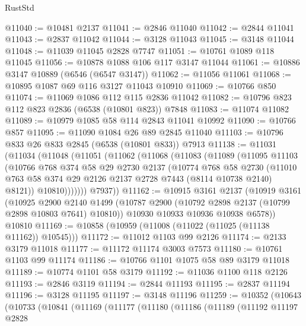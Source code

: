 \begin{lexlean}{RustStd}
\begin{coremodule}
@11040 := @10481 @2137
@11041 := @2846 @11040
@11042 := @2844 @11041
@11043 := @2837 @11042
@11044 := @3128 @11043
@11045 := @3148 @11044
@11048 := @11039 @11045 @2828 @7747
@11051 := @10761 @1089 @118 @11045
@11056 := @10878 @1088 @106 @117 @3147 @11044
@11061 := @10886 @3147 @10889 (@6546 (@6547 @3147))
@11062 := @11056 @11061
@11068 := @10895 @1087 @69 @116 @3127 @11043 @10910
@11069 := @10766 @850
@11074 := @11069 @1086 @112 @115 @2836 @11042
@11082 := @10796 @823 @112 @823 @2836 (@6538 (@10801 @823)) @7848
@11083 := @11074 @11082
@11089 := @10979 @1085 @58 @114 @2843 @11041 @10992
@11090 := @10766 @857
@11095 := @11090 @1084 @26 @89 @2845 @11040
@11103 := @10796 @833 @26 @833 @2845 (@6538 (@10801 @833)) @7913
@11138 := @11031
    (@11034
      (@11048
        (@11051
          (@11062
            (@11068
              (@11083
                (@11089
                  (@11095
                    @11103
                    (@10766
                      @768
                      @374
                      @58
                      @29
                      @2730
                      @2137
                      (@10774
                        @768
                        @58
                        @2730
                        (@11010
                          @763
                          @58
                          @374
                          @29
                          @2126
                          @2137
                          @2728
                          @7443
                          (@8114 @10738 @2140)
                          @8121))
                      @10810)))))))
        @7937))
@11162 := @10915
    @3161
    @2137
    (@10919
      @3161
      (@10925
        @2900
        @2140
        @1499
        (@10787 @2900 (@10792 @2898 @2137 (@10799 @2898 @10803 @7641) @10810))
        @10930
        @10933
        @10936
        @10938
        @6578))
    @10810
@11169 := @10858 (@10959 (@11008 (@11022 (@11025 (@11138 @11162)) @10545)))
@11172 := @11012 @1103 @99 @2126
@11174 := @2133 @3179 @11018
@11177 := @11172 @11174 @3003 @7573
@11180 := @10761 @1103 @99 @11174
@11186 := @10766 @1101 @1075 @58 @89 @3179 @11018
@11189 := @10774 @1101 @58 @3179
@11192 := @11036 @1100 @118 @2126
@11193 := @2846 @3119
@11194 := @2844 @11193
@11195 := @2837 @11194
@11196 := @3128 @11195
@11197 := @3148 @11196
@11259 := @10352
    (@10643
      (@10733
        (@10841
          (@11169
            (@11177
              (@11180
                (@11186
                  (@11189
                    (@11192
                      @11197
                      @2828

\end{coremodule}
\end{lexlean}
